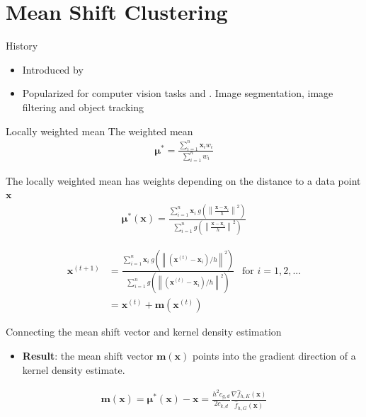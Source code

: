 \documentclass[18pt]{beamer}
\newcommand{\norm}[1]{\left\lVert#1\right\rVert}
\begin{document}
\section{Mean Shift Clustering}


\begin{frame}{History}
\begin{itemize}
	\item Introduced by \cite{Fukunaga.1975}
	\item Popularized for computer vision tasks \cite{Comaniciu.2002} and \cite{Comaniciu.2003}. Image segmentation, image filtering and object tracking
\end{itemize}
\end{frame}


\begin{frame}{Locally weighted mean}
	The weighted mean
	\begin{align*}
		\bm{\mu}^* = \frac{\sum_{i=1}^n \bm{x}_i w_i}{\sum_{i=1}^n w_i}
	\end{align*}
	
	The locally weighted mean has weights depending on the distance to a data point $\bm{x}$
	\begin{align*}
		\bm{\mu}^*(\bm{x}) = \frac{\sum_{i=1}^n \bm{x}_i\ g\left(\norm{\frac{\bm{x} - \bm{x}_i}{h}}^2 \right)}{\sum_{i=1}^n g\left(\norm{\frac{\bm{x} - \bm{x}_i}{h}}^2 \right)}
	\end{align*}
\end{frame}


\begin{frame}
	\begin{align*}
		\bm{x}^{(t+1)} &= \frac{\sum_{i=1}^n \bm{x}_i\ g\left(\norm{(\bm{x}^{(t)} - \bm{x}_i) / h}^2 \right)}{\sum_{i=1}^n g\left(\norm{(\bm{x}^{(t)} - \bm{x}_i) / h}^2 \right)} & \text{for } i = 1, 2, ... \\[1em]
		&= \bm{x}^{(t)} + \bm{m}\left(\bm{x}^{(t)}\right) &
	\end{align*}
\end{frame}

\begin{frame}{Connecting the mean shift vector and kernel density estimation}
	\begin{itemize}
		\item \textbf{Result}: the mean shift vector $\bm{m}(\bm{x})$ points into the gradient direction of a kernel density estimate. 
	\end{itemize}
	\begin{align*}
		\bm{m}(\bm{x}) = \bm{\mu}^*(\bm{x}) - \bm{x} = \frac{h^2c_{g,d}}{2c_{k,d}} \frac{\nabla \hat{f}_{h,K}(\bm{x})}{\hat{f}_{h,G}(\bm{x})}
	\end{align*}
\end{frame}
\end{document}
